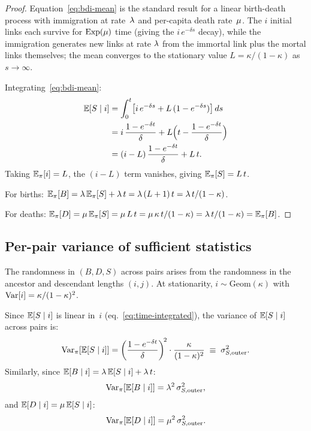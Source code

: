 \begin{proof}
Equation~\eqref{eq:bdi-mean} is the standard result for a
linear birth-death process with immigration at rate~$\lambda$
and per-capita death rate~$\mu$.
The $i$ initial links each survive for $\mathrm{Exp}(\mu)$ time
(giving the $i\,e^{-\delta s}$ decay), while the immigration
generates new links at rate $\lambda$ from the immortal link plus
the mortal links themselves; the mean converges to the stationary
value $L = \kappa/(1-\kappa)$ as $s \to \infty$.

Integrating~\eqref{eq:bdi-mean}:
\begin{align*}
\mathbb{E}[S \mid i]
  &= \int_0^t \bigl[i\,e^{-\delta s}
     + L\,(1 - e^{-\delta s})\bigr]\,ds \\
  &= i\,\frac{1 - e^{-\delta t}}{\delta}
     + L\Bigl(t - \frac{1 - e^{-\delta t}}{\delta}\Bigr) \\
  &= (i - L)\,\frac{1 - e^{-\delta t}}{\delta}
     + L\,t.
\end{align*}
Taking $\mathbb{E}_\pi[i] = L$, the $(i-L)$ term vanishes, giving
$\mathbb{E}_\pi[S] = L\,t$.

For births:
$\mathbb{E}_\pi[B]
  = \lambda\,\mathbb{E}_\pi[S] + \lambda\,t
  = \lambda\,(L+1)\,t
  = \lambda\,t/(1-\kappa)$.

For deaths:
$\mathbb{E}_\pi[D]
  = \mu\,\mathbb{E}_\pi[S]
  = \mu\,L\,t
  = \mu\,\kappa\,t/(1-\kappa)
  = \lambda\,t/(1-\kappa)
  = \mathbb{E}_\pi[B]$.
\end{proof}

\subsection{Per-pair variance of sufficient statistics}

The randomness in $(B, D, S)$ across pairs arises from the randomness
in the ancestor and descendant lengths $(i, j)$.
At stationarity, $i \sim \mathrm{Geom}(\kappa)$ with
$\mathrm{Var}[i] = \kappa/(1-\kappa)^2$.

Since $\mathbb{E}[S \mid i]$ is linear in~$i$
(eq.~\eqref{eq:time-integrated}), the variance of $\mathbb{E}[S \mid i]$
across pairs is:
\begin{equation}\label{eq:var-ES-outer}
\mathrm{Var}_\pi[\mathbb{E}[S \mid i]]
  = \left(\frac{1 - e^{-\delta t}}{\delta}\right)^{\!2}
    \cdot \frac{\kappa}{(1-\kappa)^2}
  \;\equiv\; \sigma^2_{S,\text{outer}}.
\end{equation}
Similarly, since $\mathbb{E}[B \mid i] = \lambda\,\mathbb{E}[S \mid i] + \lambda\,t$:
\begin{equation}\label{eq:var-EB-outer}
\mathrm{Var}_\pi[\mathbb{E}[B \mid i]]
  = \lambda^2\,\sigma^2_{S,\text{outer}},
\end{equation}
and $\mathbb{E}[D \mid i] = \mu\,\mathbb{E}[S \mid i]$:
\begin{equation}\label{eq:var-ED-outer}
\mathrm{Var}_\pi[\mathbb{E}[D \mid i]]
  = \mu^2\,\sigma^2_{S,\text{outer}}.
\end{equation}

